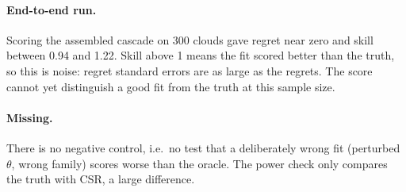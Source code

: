 \documentclass[11pt]{article}
\begin{document}
\paragraph{End-to-end run.}
Scoring the assembled cascade on 300 clouds gave regret near zero and skill between 0.94 and 1.22. Skill above
1 means the fit scored better than the truth, so this is noise: regret standard errors are as large as the
regrets. The score cannot yet distinguish a good fit from the truth at this sample size.

\paragraph{Missing.}
There is no negative control, i.e.\ no test that a deliberately wrong fit (perturbed $\theta$, wrong family)
scores worse than the oracle. The power check only compares the truth with CSR, a large difference.
\end{document}
